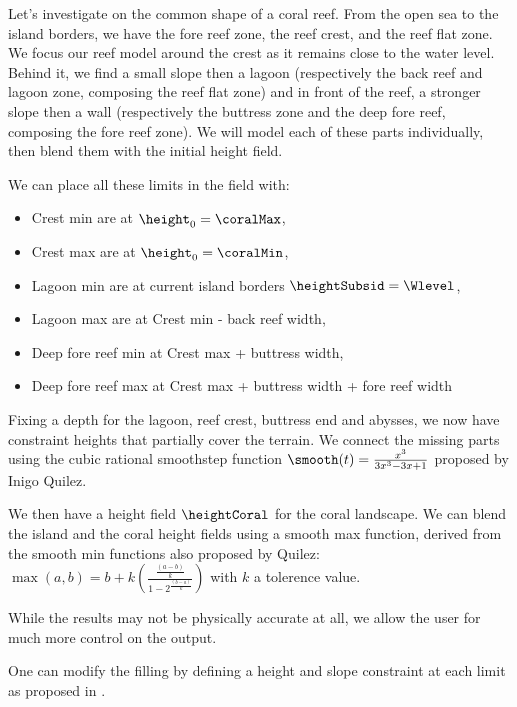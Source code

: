 Let's investigate on the common shape of a coral reef. From the open sea to the island borders, we have the fore reef zone, the reef crest, and the reef flat zone. We focus our reef model around the crest as it remains close to the water level. Behind it, we find a small slope then a lagoon (respectively the back reef and lagoon zone, composing the reef flat zone) and in front of the reef, a stronger slope then a wall (respectively the buttress zone and the deep fore reef, composing the fore reef zone). We will model each of these parts individually, then blend them with the initial height field.

We can place all these limits in the field with:
\begin{itemize}
    \item Crest min are at $\height_0 = \coralMax$,
    \item Crest max are at $\height_0 = \coralMin$,
    \item Lagoon min are at current island borders $\heightSubsid = \Wlevel$,
    \item Lagoon max are at Crest min - back reef width,
    \item Deep fore reef min at Crest max + buttress width,
    \item Deep fore reef max at Crest max + buttress width + fore reef width
\end{itemize}

Fixing a depth for the lagoon, reef crest, buttress end and abysses, we now have constraint heights that partially cover the terrain. We connect the missing parts using the cubic rational smoothstep function $\smooth(t) = \frac{x^3}{3x^3 - 3x + 1}$ proposed by Inigo Quilez.

We then have a height field $\heightCoral$ for the coral landscape. We can blend the island and the coral height fields using a smooth max function, derived from the smooth min functions also proposed by Quilez: $\max(a, b) = b + k \left( \frac{\frac{\left( a-b \right)}{k}}{1-2^{\frac{\left( b - a  \right)}{k}}} \right)$ with $k$ a tolerence value. 


While the results may not be physically accurate at all, we allow the user for much more control on the output.

One can modify the filling by defining a height and slope constraint at each limit as proposed in \citep{Guerin2022}.


